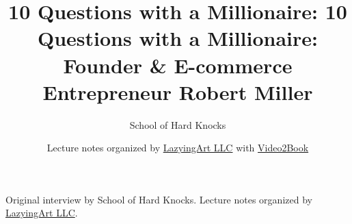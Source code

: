\documentclass[11pt,oneside]{book}
\begin{document}
\frontmatter
\title{10 Questions with a Millionaire: 10 Questions with a Millionaire: Founder \& E-commerce Entrepreneur Robert Miller}
\author{School of Hard Knocks}
\date{Lecture notes organized by \href{https://lazying.art}{LazyingArt LLC} with \href{https://github.com/lachlanchen/Video2Book}{Video2Book}}
\maketitle
\begin{center}
\small Original interview by School of Hard Knocks. Lecture notes organized by \href{https://lazying.art}{LazyingArt LLC}.
\end{center}
\clearpage
\mainmatter

\end{document}
